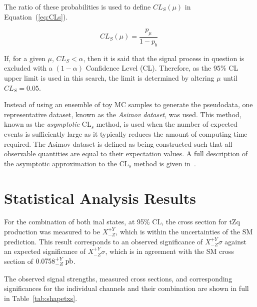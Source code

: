 The ratio of these probabilities is used to define $CL_{S} (\mu)$ in Equation~(\ref{eq:CLs}).

\begin{equation}
CL_{S} (\mu) = \frac{ p_{\mu} }{ 1 - p_{b} }\;
\label{eq:CLs}
\end{equation}

If, for a given $\mu$, $CL_{S} < \alpha$, then it is said that the signal process in question is excluded with a $(1 - \alpha)$ Confidence Level (CL).
Therefore, as the 95\% CL upper limit is used in this search, the limit is determined by altering $\mu$  until $CL_{S} = 0.05$.

Instead of using an ensemble of toy MC samples to generate the pseudodata, one representative dataset, known as the \emph{Asimov dataset}, was used.
This method, known as the \emph{asymptotic} CL$_{s}$ method, is used when the number of expected events is sufficiently large as it typically reduces the amount of computing time required.
The Asimov dataset is defined as being constructed such that all observable quantities are equal to their expectation values.
A full description of the asymptotic approximation to the CL$_{s}$ method is given in~\cite{AsymptoticFormulae}.

\section{Statistical Analysis Results}
For the combination of both inal states, at 95\% CL, the cross section for tZq production was measured to be $X^{+Y}_{-Z}$, which is within the uncertainties of the SM prediction.
This result corresponds to an observed significance of $X_{-Z}^{+Y} \sigma$ against an expected significance of $X_{-Z}^{+Y} \sigma$, which is in agreement with the SM cross section of  $0.0758^{+Y}_{-Z} \mbox{\ensuremath{\,\text{pb}}}$.

The observed signal strengths, measured cross sections, and corresponding significances for the individual channels and their combination are shown in full in Table~\ref{tab:shapetxs}.

